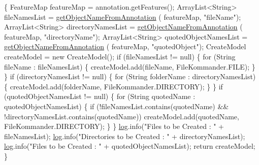 \begin{DoxyCode}
                                                                               
        \{
        FeatureMap featureMap = annotation.getFeatures();
        ArrayList<String> fileNamesList = \hyperlink{classcom_1_1poly_1_1nlp_1_1filekommander_1_1file_1_1actions_1_1_analyse_action_a8652e1bba48585a8c416e6e212fe4766}{getObjectNameFromAnnotation}
      (
                featureMap, \textcolor{stringliteral}{"fileName"});
        ArrayList<String> directoryNamesList = \hyperlink{classcom_1_1poly_1_1nlp_1_1filekommander_1_1file_1_1actions_1_1_analyse_action_a8652e1bba48585a8c416e6e212fe4766}{getObjectNameFromAnnotation}
      (
                featureMap, \textcolor{stringliteral}{"directoryName"});
        ArrayList<String> quotedObjectNamesList = \hyperlink{classcom_1_1poly_1_1nlp_1_1filekommander_1_1file_1_1actions_1_1_analyse_action_a8652e1bba48585a8c416e6e212fe4766}{getObjectNameFromAnnotation}
      (
                featureMap, \textcolor{stringliteral}{"quotedObject"});
        CreateModel createModel = \textcolor{keyword}{new} CreateModel();
        \textcolor{keywordflow}{if} (fileNamesList != null) \{
            \textcolor{keywordflow}{for} (String fileName : fileNamesList) \{
                createModel.add(fileName, FileKommander.FILE);
            \}
        \}
        \textcolor{keywordflow}{if} (directoryNamesList != null) \{
            \textcolor{keywordflow}{for} (String folderName : directoryNamesList) \{
                createModel.add(folderName, FileKommander.DIRECTORY);
            \}
        \}
        \textcolor{keywordflow}{if} (quotedObjectNamesList != null) \{
            \textcolor{keywordflow}{for} (String quotedName : quotedObjectNamesList) \{
                \textcolor{keywordflow}{if} (!fileNamesList.contains(quotedName)
                        && !directoryNamesList.contains(quotedName))
                    createModel.add(quotedName, FileKommander.DIRECTORY);
            \}
        \}
        \hyperlink{classcom_1_1poly_1_1nlp_1_1filekommander_1_1file_1_1actions_1_1_analyse_action_ae99df52b353dd7b0d2014d581fcc8cff}{log}.info(\textcolor{stringliteral}{"Files to be Created : "} + fileNamesList);
        \hyperlink{classcom_1_1poly_1_1nlp_1_1filekommander_1_1file_1_1actions_1_1_analyse_action_ae99df52b353dd7b0d2014d581fcc8cff}{log}.info(\textcolor{stringliteral}{"Directories to be Created : "} + directoryNamesList);
        \hyperlink{classcom_1_1poly_1_1nlp_1_1filekommander_1_1file_1_1actions_1_1_analyse_action_ae99df52b353dd7b0d2014d581fcc8cff}{log}.info(\textcolor{stringliteral}{"Files to be Created : "} + quotedObjectNamesList);
        \textcolor{keywordflow}{return} createModel;
    \}
\end{DoxyCode}
